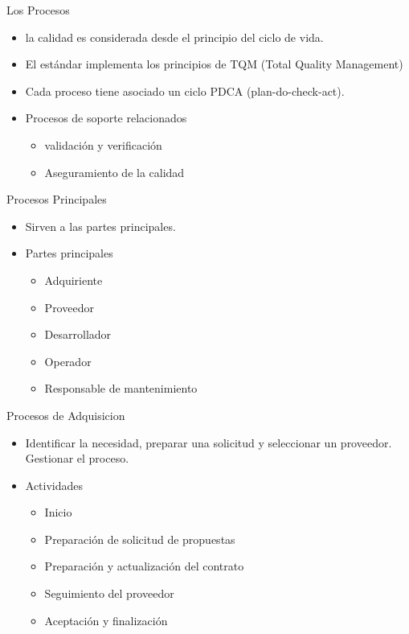 \documentclass{beamer}
\begin{document}
			\begin{frame}{Los Procesos}
				\begin{itemize}
					\item la calidad es considerada desde el principio del ciclo de vida.
					\item El estándar implementa los principios de TQM (Total Quality Management)
					\item Cada proceso tiene asociado un ciclo PDCA (plan-do-check-act).
					\item Procesos de soporte relacionados
					\begin{itemize}
						\item validación y verificación 
						\item Aseguramiento de la calidad
					\end{itemize}
				\end{itemize}
			\end{frame}
			
			\begin{frame}{Procesos Principales}
				\begin{itemize}
					\item Sirven a las partes principales.
					\item Partes principales
					\begin{itemize}
						\item Adquiriente
						\item Proveedor
						\item Desarrollador
						\item Operador
						\item Responsable de mantenimiento
					\end{itemize}
				\end{itemize}
			\end{frame}
			
			\begin{frame}{Procesos de Adquisicion}
				\begin{itemize}
					\item Identificar la necesidad, preparar una solicitud y seleccionar un proveedor. Gestionar el proceso. 
					\item Actividades
					\begin{itemize}
						\item Inicio
						\item Preparación de solicitud de propuestas
						\item Preparación y actualización del contrato
						\item Seguimiento del proveedor
						\item Aceptación y finalización
					\end{itemize}
				\end{itemize}
			\end{frame}
			
\end{document}
